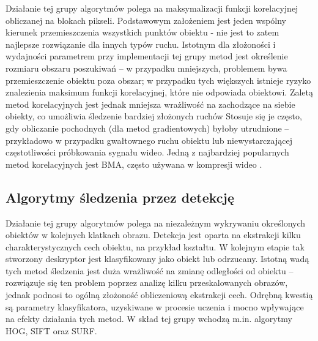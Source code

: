 Działanie tej grupy algorytmów polega na maksymalizacji funkcji korelacyjnej obliczanej na blokach pikseli. %
Podstawowym założeniem jest jeden wspólny kierunek przemieszczenia wszystkich punktów obiektu - nie jest to zatem najlepsze rozwiązanie dla innych typów ruchu. %
Istotnym dla złożoności i wydajności parametrem przy implementacji tej grupy metod jest określenie rozmiaru obszaru poszukiwań -- w przypadku mniejszych, problemem bywa przemieszczenie obiektu poza obszar; w przypadku tych większych istnieje ryzyko znalezienia maksimum funkcji korelacyjnej, które nie odpowiada obiektowi. %
Zaletą metod korelacyjnych jest jednak mniejsza wrażliwość na zachodzące na siebie obiekty, co umożliwia śledzenie bardziej złożonych ruchów %
Stosuje się je często, gdy obliczanie pochodnych (dla metod gradientowych) byłoby utrudnione -- przykładowo w przypadku gwałtownego ruchu obiektu lub niewystarczającej częstotliwości próbkowania sygnału wideo. %
Jedną z najbardziej popularnych metod korelacyjnych jest BMA, często używana w kompresji wideo \cite{Aroh}.

\subsection{Algorytmy śledzenia przez detekcję}
Działanie tej grupy algorytmów polega na niezależnym wykrywaniu określonych obiektów w kolejnych klatkach obrazu. Detekcja jest oparta na ekstrakcji kilku charakterystycznych cech obiektu, na przykład kształtu. W kolejnym etapie tak stworzony deskryptor jest klasyfikowany jako obiekt lub odrzucany. Istotną wadą tych metod śledzenia jest duża wrażliwość na zmianę odległości od obiektu -- rozwiązuje się ten problem poprzez analizę kilku przeskalowanych obrazów, jednak podnosi to ogólną złożoność obliczeniową ekstrakcji cech. Odrębną kwestią są parametry klasyfikatora, uzyskiwane w procesie uczenia i mocno wpływające na efekty działania tych metod.
W skład tej grupy wchodzą m.in. algorytmy HOG, SIFT oraz SURF.

